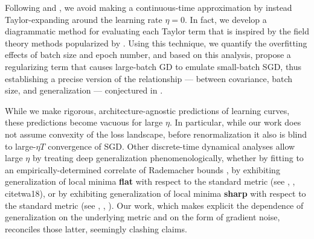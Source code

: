 \documentclass{article}
\begin{document}

    Following \citet{li17} and \citet{ro18}, we avoid making a continuous-time
    approximation by instead Taylor-expanding around the learning rate
    $\eta=0$.  In fact, we develop a diagrammatic method for evaluating each
    Taylor term that is inspired by the field theory methods popularized by
    \citet{dy49a}.  Using this technique, we quantify the overfitting effects
    of batch size and epoch number, and based on this analysis, propose a
    regularizing term that causes large-batch GD to emulate small-batch SGD,
    thus establishing a precise version of the relationship --- between
    covariance, batch size, and generalization --- conjectured in
    \citet{ja18}.  
    

    While we make rigorous, architecture-agnostic predictions of learning
    curves, these predictions become vacuous for large $\eta$.  In particular,
    while our work does not assume convexity of the loss landscape, before
    renormalization it also is blind to large-$\eta T$ convergence of SGD.
    Other discrete-time dynamical analyses allow large $\eta$ by treating deep
    generalization phenomenologically, whether by fitting to an
    empirically-determined correlate of Rademacher bounds \citep{li18}, by
    exhibiting generalization of local minima {\bf flat} with respect to the
    standard metric (see \citet{ho17}, \citet{ke17}, citet{wa18}), or by
    exhibiting generalization of local minima {\bf sharp} with respect to the
    standard metric (see \citet{st56}, \citet{di17}, \citet{wu18}).  Our work,
    which makes explicit the dependence of generalization on the underlying
    metric and on the form of gradient noise, reconciles those latter,
    seemingly clashing claims.
    
\end{document}
